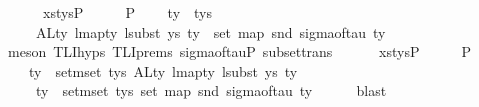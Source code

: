 \begin{isabellebody}
\ \ \ \ \ \ xs{\isacharunderscore}{\kern0pt}tys{\isacharunderscore}{\kern0pt}P{}{\isacharparenright}{\kern0pt}\isanewline
\ \ \isamarkupfalse%
\ \isamarkupfalse%
\ P{}{\isacharcolon}{\kern0pt}\isanewline
\ \ \ \ {\isachardoublequoteopen}{\isasymforall}ty\ {\isasymin}{\isacharhash}{\kern0pt}\ tys{\isachardot}{\kern0pt}\isanewline
\ \ \ \ \ ALty\ {\isacharparenleft}{\kern0pt}lmap{\isacharunderscore}{\kern0pt}ty\ {\isacharparenleft}{\kern0pt}lsubst\ ys{\isacharparenright}{\kern0pt}\ ty{\isacharparenright}{\kern0pt}\ {\isacharequal}{\kern0pt}\ set\ {\isacharparenleft}{\kern0pt}map\ snd\ {\isacharparenleft}{\kern0pt}sigma{\isacharunderscore}{\kern0pt}of{\isacharunderscore}{\kern0pt}tau\ ty{\isacharparenright}{\kern0pt}{\isacharparenright}{\kern0pt}{\isachardoublequoteclose}\isanewline
\ \ \ \ \isamarkupfalse%
\ {\isacharparenleft}{\kern0pt}meson\ TLI{\isachardot}{\kern0pt}hyps\ TLI{\isachardot}{\kern0pt}prems{\isacharparenleft}{\kern0pt}{}{\isacharcomma}{\kern0pt}{}{\isacharparenright}{\kern0pt}\ sigma{\isacharunderscore}{\kern0pt}of{\isacharunderscore}{\kern0pt}tau{\isacharunderscore}{\kern0pt}P{}\ subset{\isacharunderscore}{\kern0pt}trans\isanewline
\ \ \ \ \ \ xs{\isacharunderscore}{\kern0pt}tys{\isacharunderscore}{\kern0pt}P{}{\isacharparenright}{\kern0pt}\isanewline
\ \ \isamarkupfalse%
\ \isamarkupfalse%
\ P{}{\isacharcolon}{\kern0pt}\isanewline
\ \ \ \ {\isachardoublequoteopen}{\isacharparenleft}{\kern0pt}{\isasymUnion}ty\ {\isasymin}\ set{\isacharunderscore}{\kern0pt}mset\ tys{\isachardot}{\kern0pt}\ {\isacharparenleft}{\kern0pt}ALty\ {\isacharparenleft}{\kern0pt}lmap{\isacharunderscore}{\kern0pt}ty\ {\isacharparenleft}{\kern0pt}lsubst\ ys{\isacharparenright}{\kern0pt}\ ty{\isacharparenright}{\kern0pt}{\isacharparenright}{\kern0pt}{\isacharparenright}{\kern0pt}\ {\isacharequal}{\kern0pt}\isanewline
\ \ \ \ \ {\isacharparenleft}{\kern0pt}{\isasymUnion}ty\ {\isasymin}\ set{\isacharunderscore}{\kern0pt}mset\ tys{\isachardot}{\kern0pt}\ {\isacharparenleft}{\kern0pt}set\ {\isacharparenleft}{\kern0pt}map\ snd\ {\isacharparenleft}{\kern0pt}sigma{\isacharunderscore}{\kern0pt}of{\isacharunderscore}{\kern0pt}tau\ ty{\isacharparenright}{\kern0pt}{\isacharparenright}{\kern0pt}{\isacharparenright}{\kern0pt}{\isacharparenright}{\kern0pt}{\isachardoublequoteclose}\isanewline
\ \ \ \ \isamarkupfalse%
\ blast\isanewline
\ \ \isamarkupfalse%
\ \isamarkupfalse%

\end{isabellebody}

